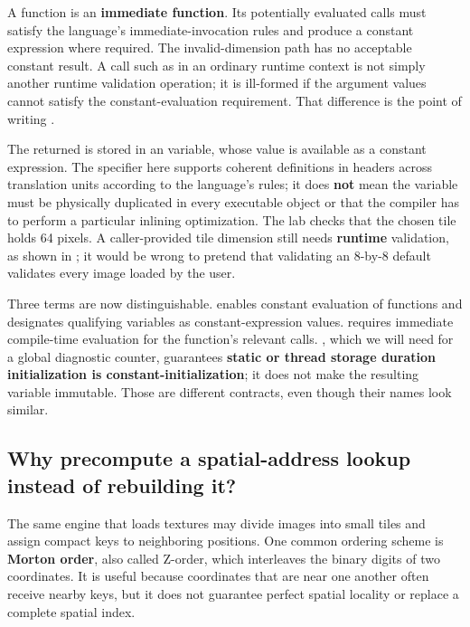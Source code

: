 A  function is an \textbf{immediate function}. Its potentially evaluated calls must satisfy the language's immediate-invocation rules and produce a constant expression where required. The invalid-dimension path has no acceptable constant result. A call such as  in an ordinary runtime context is not simply another runtime validation operation; it is ill-formed if the argument values cannot satisfy the constant-evaluation requirement. That difference is the point of writing .

The returned  is stored in an  variable, whose value is available as a constant expression. The  specifier here supports coherent definitions in headers across translation units according to the language's rules; it does \textbf{not} mean the variable must be physically duplicated in every executable object or that the compiler has to perform a particular inlining optimization. The lab checks that the chosen tile holds 64 pixels. A caller-provided tile dimension still needs \textbf{runtime} validation, as shown in ; it would be wrong to pretend that validating an 8-by-8 default validates every image loaded by the user.

Three terms are now distinguishable.  enables constant evaluation of functions and designates qualifying variables as constant-expression values.  requires immediate compile-time evaluation for the function's relevant calls. , which we will need for a global diagnostic counter, guarantees \textbf{static or thread storage duration initialization is constant-initialization}; it does not make the resulting variable immutable. Those are different contracts, even though their names look similar.

\subsection{Why precompute a spatial-address lookup instead of rebuilding it?}\label{01-foundations-i-ch005-why-precompute-a-spatial-address-lookup-instead-of-rebuilding-it}

\hypertarget{01-foundations-i-ch005-why-precompute-a-spatial-address-lookup-instead-of-rebuilding-it}{}

The same engine that loads textures may divide images into small tiles and assign compact keys to neighboring positions. One common ordering scheme is \textbf{Morton order}, also called Z-order, which interleaves the binary digits of two coordinates. It is useful because coordinates that are near one another often receive nearby keys, but it does not guarantee perfect spatial locality or replace a complete spatial index.

